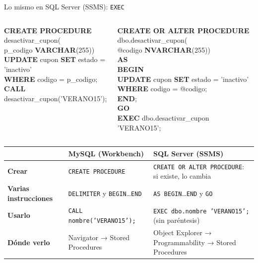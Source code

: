\documentclass[aspectratio=169,10pt,c]{beamer}
\newcommand{\kw}[1]{\textcolor{utpRojo}{\textbf{#1}}}
\newcommand{\etiqueta}[1]{\tikz[baseline=-0.5ex]{\node[rounded corners=2pt,fill=utpNegro,text=white,
  font=\bfseries\scriptsize,inner xsep=6pt,inner ysep=3pt] {#1};}}
\newcommand{\dentro}[1]{{\setlength{\fboxsep}{1.5pt}\colorbox{yellow!45}{#1}}}
\newenvironment{sqlmini}[1][.86\textwidth]
  {\begin{center}\begin{lrbox}{\sqlbuf}\begin{minipage}{#1}\ttfamily\fontsize{7}{8.3}\selectfont\vspace{4pt}\raggedright}
  {\vspace{4pt}\end{minipage}\end{lrbox}\colorbox{utpGrisClaro}{\usebox{\sqlbuf}}\end{center}}
\newcommand{\col}{\dimexpr\textwidth-2\fboxsep\relax}
\newcommand{\ind}{\hspace*{1.2em}}
\begin{document}
\begin{frame}{Lo mismo en SQL Server (SSMS): \texttt{EXEC}}
\begin{columns}[T,onlytextwidth]
\centering\etiqueta{MySQL}
\begin{sqlmini}[\col]
\kw{CREATE PROCEDURE} desactivar\_cupon(\\
\ind p\_codigo \kw{VARCHAR}(255))\\
\kw{UPDATE} cupon \kw{SET} estado = 'inactivo'\\
\kw{WHERE} codigo = p\_codigo;\\[6pt]
\dentro{\kw{CALL}} desactivar\_cupon('VERANO15');
\end{sqlmini}
\centering\etiqueta{SQL Server}
\begin{sqlmini}[\col]
\kw{CREATE OR ALTER PROCEDURE} dbo.desactivar\_cupon(\\
\ind @codigo \kw{NVARCHAR}(255))\\
\kw{AS}\\
\kw{BEGIN}\\
\ind\kw{UPDATE} cupon \kw{SET} estado = 'inactivo'\\
\ind\kw{WHERE} codigo = @codigo;\\
\kw{END};\\
\kw{GO}\\[4pt]
\dentro{\kw{EXEC}} dbo.desactivar\_cupon 'VERANO15';
\end{sqlmini}
\end{columns}
\vspace{0.1cm}
\begin{center}
\scriptsize
\renewcommand{\arraystretch}{1.2}
\begin{tabular}{@{}>{\bfseries}p{2.5cm}>{\raggedright}p{4.3cm}>{\raggedright\arraybackslash}p{5.6cm}@{}}
\toprule
 & \bfseries MySQL (Workbench) & \bfseries SQL Server (SSMS) \\
\midrule
Crear & \texttt{CREATE PROCEDURE} & \texttt{CREATE OR ALTER PROCEDURE}: si existe, lo cambia \\
Varias instrucciones & \texttt{DELIMITER} y \texttt{BEGIN}\ldots\texttt{END} & \texttt{AS BEGIN}\ldots\texttt{END} y \texttt{GO} \\
Usarlo & \texttt{CALL nombre('VERANO15');} & \texttt{EXEC dbo.nombre 'VERANO15';} (sin paréntesis) \\
Dónde verlo & Navigator → Stored Procedures & Object Explorer → Programmability → Stored Procedures \\
\bottomrule
\end{tabular}
\end{center}
\end{frame}
\end{document}
